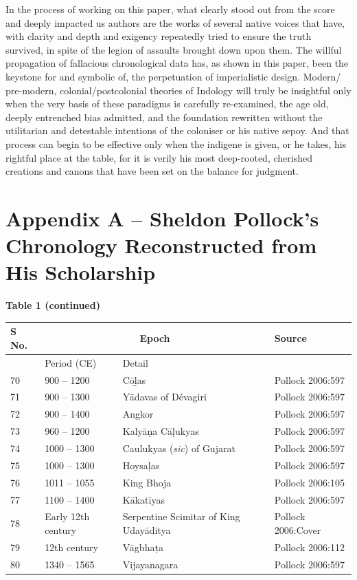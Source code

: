 In the process of working on this paper, what clearly stood out from the score and deeply impacted us authors are the works of several native voices that have, with clarity and depth and exigency repeatedly tried to ensure the truth survived, in spite of the legion of assaults brought down upon them. The willful propagation of fallacious chronological data has, as shown in this paper, been the keystone for and symbolic of, the perpetuation of imperialistic design. Modern/ pre-modern, colonial/postcolonial theories of Indology will truly be insightful only when the very basis of these paradigms is carefully re-examined, the age old, deeply entrenched bias admitted, and the foundation rewritten without the utilitarian and detestable intentions of the coloniser or his native sepoy. And that process can begin to be effective only when the indigene is given, or he takes, his rightful place at the table, for it is verily his most deep-rooted, cherished creations and canons that have been set on the balance for judgment.


\section*{Appendix A -- Sheldon Pollock’s Chronology Reconstructed from His Scholarship}

\textbf{Table 1 (continued)}

\begin{longtable}{|l|p{2.5cm}|p{2.5cm}|p{2.4cm}|}
\hline
S No. & \multicolumn{2}{c|}{Epoch} & Source \\
\hline
  & Period (CE) & Detail &   \\
\hline
70 & 900 – 1200 & Cōḻas & Pollock 2006:597 \\
\hline
71 & 900 – 1300 & Yādavas of Dévagiri & Pollock 2006:597 \\
\hline
72 & 900 – 1400 & Angkor & Pollock 2006:597 \\
\hline
73 & 960 – 1200 & Kalyāṇa Cāḷukyas & Pollock 2006:597 \\
\hline
74 & 1000 – 1300 & Caulukyas (\textit{sic}) of Gujarat & Pollock 2006:597 \\
\hline
75 & 1000 – 1300 & Hoysaḷas\index{Hoysalas} & Pollock 2006:597 \\
\hline
76 & 1011 – 1055 & King Bhoja\index{Bhoja} & Pollock 2006:105 \\
\hline
77 & 1100 – 1400 & Kākatīyas\index{Kakatiyas@Kākatīyas} & Pollock 2006:597 \\
\hline
78 & Early 12th   century & Serpentine Scimitar of King Udayāditya & Pollock 2006:Cover \\
\hline
79 & 12th century & Vāgbhaṭa & Pollock 2006:112 \\
\hline
80 & 1340 – 1565 & Vijayanagara & Pollock\index{Pollock, Sheldon} 2006:597 \\
\hline
\end{longtable}

